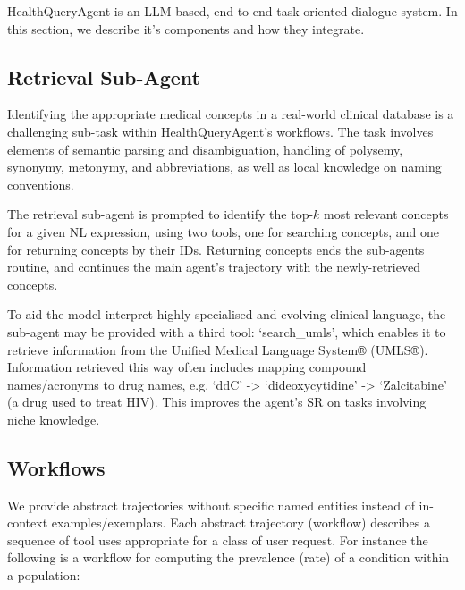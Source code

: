 \documentclass[11pt]{article}
\begin{document}
HealthQueryAgent is an LLM based, end-to-end task-oriented dialogue system.
In this section, we describe it's components and how they integrate.

\subsection{Retrieval Sub-Agent}
Identifying the appropriate medical concepts in a real-world clinical database is a challenging sub-task within HealthQueryAgent's workflows.
The task involves elements of semantic parsing and disambiguation, handling of polysemy, synonymy, metonymy, and abbreviations, as well as local knowledge on naming conventions.

The retrieval sub-agent is prompted to identify the top-$k$ most relevant concepts for a given NL expression, using two tools, one for searching concepts, and one for returning concepts by their IDs.
Returning concepts ends the sub-agents routine, and continues the main agent's trajectory with the newly-retrieved concepts.

To aid the model interpret highly specialised and evolving clinical language, the sub-agent may be provided with a third tool: `search\_umls', which enables it to retrieve information from the Unified Medical Language System® (UMLS®).
Information retrieved this way often includes mapping compound names/acronyms to drug names, e.g. `ddC' -> `dideoxycytidine' -> `Zalcitabine' (a drug used to treat HIV).
This improves the agent's SR on tasks involving niche knowledge.


\subsection{Workflows}

We provide abstract trajectories without specific named entities instead of in-context examples/exemplars.
Each abstract trajectory (workflow) describes a sequence of tool uses appropriate for a class of user request.
For instance the following is a workflow for computing the prevalence (rate) of a condition within a population:
\end{document}
